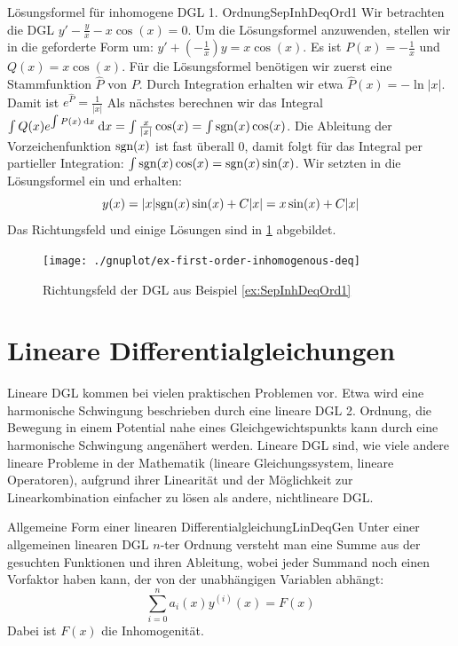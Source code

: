 \begin{example}{Lösungsformel für inhomogene DGL 1. Ordnung}{SepInhDeqOrd1}
    Wir betrachten die DGL $y'-\frac{y}{x}-x\cos(x) = 0$. Um die Lösungsformel anzuwenden, stellen wir in die geforderte Form um: $y'+(-\frac{1}{x})y=x\cos(x)$. Es ist $P(x) = -\frac{1}{x}$ und $Q(x) = x\cos(x)$. Für die Lösungsformel benötigen wir zuerst eine Stammfunktion $\hat{P}$ von $P$. Durch Integration erhalten wir etwa $\hat{P}(x) = -\ln |x|$. Damit ist $e^{\hat{P}} = \frac{1}{|x|}$ Als nächstes berechnen wir das Integral $\int Q(x) e^{\int P(x) \:\mathrm{d}{x}} \:\mathrm{d}{x} = \int \frac{x}{|x|} \cos(x) = \int \text{sgn}(x) \cos(x)$. Die Ableitung der Vorzeichenfunktion $\text{sgn}(x)$ ist fast überall $0$, damit folgt für das Integral per partieller Integration: $\int \text{sgn}(x) \cos(x) = \text{sgn}(x)\sin(x)$. Wir setzten in die Lösungsformel ein und erhalten:
    $$
        y(x) = |x| \text{sgn}(x) \sin(x) + C |x| = x \sin(x) + C |x|
    $$
    Das Richtungsfeld und einige Lösungen sind in \ref{fig:SepInhDeqOrd1} abgebildet.
\end{example}

\begin{figure}
    \centering
    \texttt{[image: ./gnuplot/ex-first-order-inhomogenous-deq]}
    \caption[Richtungsfeld einer inhomogenen DGL 1. Ordnung]{Richtungsfeld der DGL aus Beispiel \ref{ex:SepInhDeqOrd1}}
    \label{fig:SepInhDeqOrd1}
\end{figure}

\section{Lineare Differentialgleichungen}

Lineare DGL kommen bei vielen praktischen Problemen vor. Etwa wird eine harmonische Schwingung beschrieben durch eine lineare DGL 2. Ordnung, die Bewegung in einem Potential nahe eines Gleichgewichtspunkts kann durch eine harmonische Schwingung angenähert werden. Lineare DGL sind, wie viele andere lineare Probleme in der Mathematik (lineare Gleichungssystem, lineare Operatoren), aufgrund ihrer Linearität und der Möglichkeit zur Linearkombination einfacher zu lösen als andere, nichtlineare DGL.

\begin{definition}{Allgemeine Form einer linearen Differentialgleichung}{LinDeqGen}
    Unter einer allgemeinen linearen DGL $n$-ter Ordnung versteht man eine Summe aus der gesuchten Funktionen und ihren Ableitung, wobei jeder Summand noch einen Vorfaktor haben kann, der von der unabhängigen Variablen abhängt:
    $$
        \sum\limits_{i=0}^n a_i(x) y^{(i)}(x) = F(x)
    $$
    Dabei ist $F(x)$ die Inhomogenität.
\end{definition}

